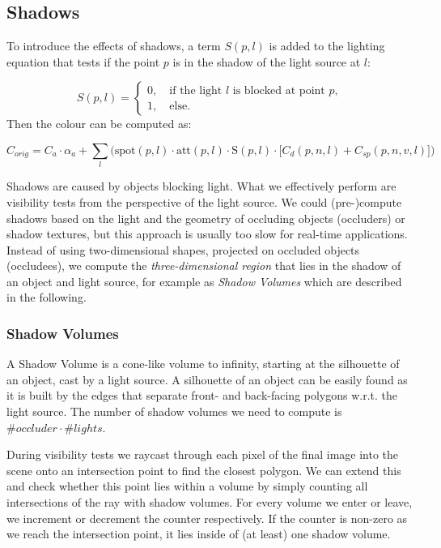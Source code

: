 \documentclass{panikzettel}
\begin{document}
\subsection{Shadows}

To introduce the effects of shadows, a term $S(p,l)$ is added to the lighting equation that tests if the point $p$ is in the shadow of the light source at $l$:

  $$ S(p,l) =\begin{cases}
    0, \quad \text{if the light } l \text{ is blocked at point } p, \\
    1, \quad \text{else}.
    \end{cases}$$
Then the colour can be computed as:

$$ C_{orig} =  C_a \cdot \alpha_a + \sum_l \bigg(\text{spot}(p,l) \cdot \text{att}(p,l) \cdot \text{S}(p,l) \cdot \big[C_d(p,n,l) + C_{sp}(p,n,v,l)\big]\bigg)
$$

Shadows are caused by objects blocking light. What we effectively perform are visibility tests from the perspective of the light source. We could (pre-)compute shadows based on the light and the geometry of occluding objects (occluders) or shadow textures, but this approach is usually too slow for real-time applications. Instead of using two-dimensional shapes, projected on occluded objects (occludees), we compute the \emph{three-dimensional region} that lies in the shadow of an object and light source, for example as \emph{Shadow Volumes} which are described in the following.

\subsubsection*{Shadow Volumes}

A Shadow Volume is a cone-like volume to infinity, starting at the silhouette of an object, cast by a light source. A silhouette of an object can be easily found as it is built by the edges that separate front- and back-facing polygons w.r.t. the light source. The number of shadow volumes we need to compute is $\# occluder \cdot \# lights$.

During visibility tests we raycast through each pixel of the final image into the scene onto an intersection point to find the closest polygon. We can extend this and check whether this point lies within a volume by simply counting all intersections of the ray with shadow volumes. For every volume we enter or leave, we increment or decrement the counter respectively. If the counter is non-zero as we reach the intersection point, it lies inside of (at least) one shadow volume.
\end{document}
